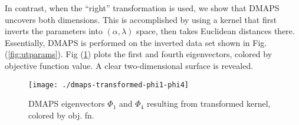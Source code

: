 \documentclass[11pt]{article}
\begin{document}
In contrast, when the ``right'' transformation is used, we show that
DMAPS uncovers both dimensions. This is accomplished by using a kernel
that first inverts the parameters into $(\alpha, \lambda)$ space, then
takes Euclidean distances there. Essentially, DMAPS is performed on the
inverted data set shown in Fig. (\ref{fig:utparams}). Fig
(\ref{fig:tdmaps14}) plots the first and fourth eigenvectors, colored
by objective function value. A clear two-dimensional surface is revealed.


\begin{figure}[htbp]
  \centering
  \texttt{[image: ./dmaps-transformed-phi1-phi4]}
  \caption{DMAPS eigenvectors $\Phi_1$ and $\Phi_4$ resulting from
    transformed kernel, colored by obj. fn. \label{fig:tdmaps14}}
\end{figure}

% 
% 
\end{document}
